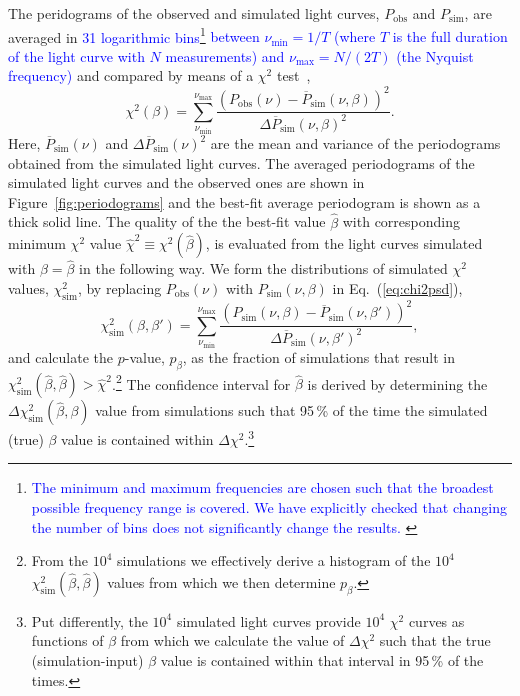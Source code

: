 \documentclass[twocolumn,linenumbers]{aastex62}
\newcommand{\response}[1]{\textcolor{blue}{#1}}
\begin{document}
The peridograms of the observed and simulated light curves, ${P}_\mathrm{obs}$ and ${P}_\mathrm{sim}$, are averaged in
\response{
31 logarithmic bins}\footnote{
\response{
The minimum and maximum frequencies are chosen such that the broadest possible frequency range is covered. We have  explicitly checked that changing the number of bins does not significantly change the results.
}
} 
\response{
\citep{1993MNRAS.261..612P} between $\nu_\mathrm{min} = 1 / T$ (where $T$ is the full duration of the light curve with $N$ measurements) and $\nu_\mathrm{max} = N  / (2T)$ (the Nyquist frequency)
}
and compared by means of a $\chi^2$ test~\citep{2014MNRAS.445..437M},
\begin{equation}
    \chi^2(\beta) = \sum_{\nu_\mathrm{min}}^{\nu_\mathrm{max}}\frac{(P_\mathrm{obs}(\nu) - \overline{P}_\mathrm{sim}(\nu,\beta))^2}{\Delta\overline{P}_\mathrm{sim}(\nu,\beta)^2}.\label{eq:chi2psd}
\end{equation}
Here, $\overline{P}_\mathrm{sim}(\nu)$ and $\Delta\overline{P}_\mathrm{sim}(\nu)^2$ are the mean and variance of the periodograms obtained from the simulated light curves.
The averaged periodograms of the simulated light curves and the observed ones are shown in Figure~\ref{fig:periodograms} and the best-fit average periodogram is shown as a thick solid line. 
The quality of the the best-fit value $\hat\beta$ with corresponding minimum $\chi^2$ value $\hat\chi^2\equiv\chi^2(\hat\beta)$, is evaluated from the light curves simulated with $\beta = \hat\beta$ in the following way. We form the distributions of simulated $\chi^2$ values, $\chi^2_\mathrm{sim}$, by replacing $P_\mathrm{obs}(\nu)$ with $P_\mathrm{sim}(\nu,\beta)$ in Eq.~(\ref{eq:chi2psd}),
\begin{equation}
    \chi^2_\mathrm{sim}(\beta,\beta') = \sum_{\nu_\mathrm{min}}^{\nu_\mathrm{max}}\frac{(P_\mathrm{sim}(\nu,\beta) - \overline{P}_\mathrm{sim}(\nu,\beta'))^2}{\Delta\overline{P}_\mathrm{sim}(\nu,\beta')^2},\label{eq:chi2psd_sim}
\end{equation}
and calculate the $p$-value, $p_\beta$, as the  fraction of simulations that result in $\chi^2_\mathrm{sim}(\hat\beta,\hat\beta) > \hat\chi^2$.\footnote{From the $10^4$ simulations we effectively derive a histogram of the $10^4$ $\chi^2_\mathrm{sim}(\hat\beta,\hat\beta)$ values from which we then determine $p_\beta$.}
The confidence interval for $\hat\beta$ is derived by determining the $\Delta\chi^2_\mathrm{sim}(\hat{\beta},\beta)$ value from simulations such that 95\,\% of the time the simulated (true) $\beta$ value is contained within $\Delta\chi^2$.\footnote{Put differently, the $10^4$ simulated light curves provide $10^4$ $\chi^2$ curves as functions of $\beta$ from which we calculate the value of $\Delta\chi^2$ such that the true (simulation-input) $\beta$ value is contained within that interval in 95\,\% of the times.}
\end{document}
